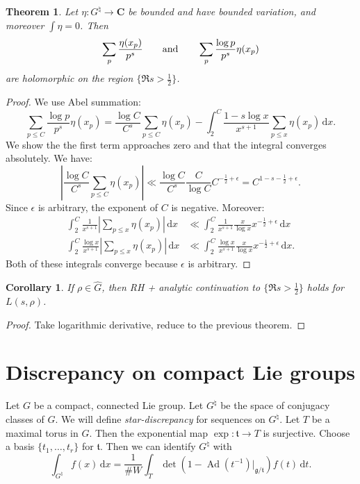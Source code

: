 \documentclass{article}
\DeclareMathOperator{\Ad}{Ad}
\newcommand{\bC}{\mathbf{C}}
\newcommand{\dd}{\mathrm{d}}
\newcommand{\fg}{\mathfrak{g}}
\newcommand{\ft}{\mathfrak{t}}
\newtheorem{theorem}[subsection]{Theorem}
\newtheorem{corollary}[subsection]{Corollary}
\theoremstyle{definition}
\begin{document}
\begin{theorem}
Let $\eta\colon G^\natural\to \bC$ be bounded and have bounded variation, and 
moreover $\int \eta = 0$. Then 
\[
	\sum_p\frac{\eta(x_p)}{p^s}
	\qquad \textnormal{and}\qquad
	\sum_p \frac{\log p}{p^s} \eta(x_p)
\]
are holomorphic on the region $\{\Re s>\frac 1 2\}$. 
\end{theorem}
\begin{proof}
We use Abel summation:
\[
	\sum_{p\leqslant C} \frac{\log p}{p^s} \eta(x_p) 
		= \frac{\log C}{C^s} \sum_{p\leqslant C} \eta(x_p) - \int_2^C \frac{1-s\log x}{x^{s+1}} \sum_{p\leqslant x} \eta(x_p)\, \dd x .
\]
We show the the first term approaches zero and that the integral converges 
absolutely. We have:
\[
	\left|\frac{\log C}{C^s} \sum_{p\leqslant C} \eta(x_p)\right| \ll \frac{\log C}{C^s} \frac{C}{\log C} C^{-\frac 1 2+\epsilon} = C^{1-s-\frac 1 2+\epsilon} .
\]
Since $\epsilon$ is arbitrary, the exponent of $C$ is negative. Moreover:
\begin{align*}
	\int_2^C \frac{1}{x^{s+1}} \left|\sum_{p\leqslant x} \eta(x_p)\right|\, \dd x 
		&\ll \int_2^C \frac{1}{x^{s+1}} \frac{x}{\log x} x^{-\frac 1 2 +\epsilon}\, \dd x \\
	\int_2^C \frac{\log x}{x^{s+1}} \left|\sum_{p\leqslant x} \eta(x_p)\right|\, \dd x 
		&\ll \int_2^C \frac{\log x}{x^{s+1}} \frac{x}{\log x} x^{-\frac 1 2 +\epsilon}\, \dd x .
\end{align*}
Both of these integrals converge because $\epsilon$ is arbitrary. 
\end{proof}

\begin{corollary}
If $\rho\in \widehat G$, then RH + analytic continuation to 
$\{\Re s>\frac 1 2\}$ holds for $L(s,\rho)$. 
\end{corollary}
\begin{proof}
Take logarithmic derivative, reduce to the previous theorem. 
\end{proof}





\section{Discrepancy on compact Lie groups}

Let $G$ be a compact, connected Lie group. Let $G^\natural$ be the space of 
conjugacy classes of $G$. We will define \emph{star-discrepancy} for sequences 
on $G^\natural$. Let $T$ be a maximal torus in $G$. Then the exponential map 
$\exp\colon \ft\to T$ is surjective. Choose a basis $\{t_1,\dots,t_r\}$ for 
$\ft$. Then we can identify $G^\natural$ with 
\[
	\int_{G^\natural} f(x)\, \dd x = \frac{1}{\# W}\int_T \det(1-\Ad(t^{-1})|_{\fg/\ft}) f(t)\, \dd t .
\]





\printbibliography
\end{document}
